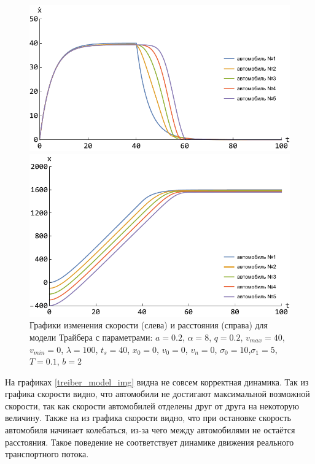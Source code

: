 \documentclass[12pt, a4paper]{extarticle}
\numberwithin{equation}{section}
\numberwithin{figure}{section}
\begin{document}
\begin{figure}[h!]
	\begin{center}
		\begin{minipage}[h!]{0.48\linewidth}
			\includegraphics[width=1\linewidth,height=0.2\textheight]
			{Images/treiber_model_speed.pdf}
		\end{minipage}
		\hfill 
		\begin{minipage}[h!]{0.48\linewidth}
			\includegraphics[width=1\linewidth,height=0.2\textheight]
			{Images/treiber_model_distance.pdf}
		\end{minipage}
		\caption{Графики изменения скорости (слева) и расстояния (справа) для модели Трайбера с параметрами: $a=0.2$, $\alpha=8$, $q=0.2$, $v_{max}=40$, $v_{min}=0$, $\lambda=100$, $t_s=40$, $x_0=0$, $v_0=0$, $v_n=0$, $\sigma_0=10$,$\sigma_1=5$, $T=0.1$, $b=2$ }
		\label{treiber_model_img}
	\end{center}
\end{figure}

На графиках \eqref{treiber_model_img} видна не совсем корректная динамика. Так из графика скорости видно, что автомобили не достигают максимальной возможной скорости, так как скорости автомобилей отделены друг от друга на некоторую величину. Также на из графика скорости видно, что при остановке скорость автомобиля начинает колебаться, из-за чего между автомобилями не остаётся расстояния. Такое поведение не соответствует динамике движения реального транспортного потока. 
\end{document}
